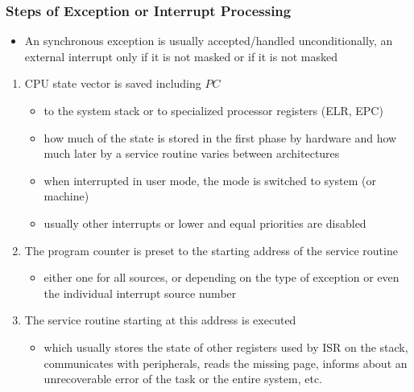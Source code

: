 \documentclass{beamer}
\begin{document}
\begin{frame}
\frametitle{Steps of Exception or Interrupt Processing}

\begin{itemize}
 \item An synchronous exception is usually accepted/handled unconditionally,
an external interrupt only if it is not masked or if it is not masked
\end{itemize}

\begin{enumerate}
 \item CPU state vector is saved including $PC$
 \begin{itemize}
  \item to the system stack or to specialized processor registers (ELR, EPC)
  \item how much of the state is stored in the first phase by hardware and how much later by a service routine varies between architectures
  \item when interrupted in user mode, the mode is switched to system (or machine)
  \item usually other interrupts or lower and equal priorities are disabled
 \end{itemize}
 \item The program counter is preset to the starting address of the service routine
 \begin{itemize}
  \item either one for all sources, or depending on the type of exception or even the individual interrupt source number
 \end{itemize}
 \item The service routine starting at this address is executed
 \begin{itemize}
  \item which usually stores the state of other registers used by ISR on the stack, communicates with peripherals, reads the missing page, informs about an unrecoverable error of the task or the entire system, etc.
 \end{itemize}
\end{enumerate}
\end{frame}
\end{document}
